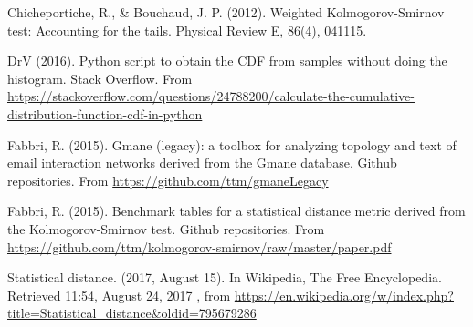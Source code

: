 \documentclass[12pt,fleqn]{article}
\begin{document}
\begin{thebibliography}{99}
\fontsize{11}{0}\selectfont
{}
Chicheportiche, R., \& Bouchaud, J. P. (2012). Weighted Kolmogorov-Smirnov test: Accounting for the tails. Physical Review E, 86(4), 041115.

	DrV (2016). Python script to obtain the CDF from samples without doing the histogram.
		Stack Overflow.
		From \url{https://stackoverflow.com/questions/24788200/calculate-the-cumulative-distribution-function-cdf-in-python}

	Fabbri, R. (2015). Gmane (legacy): a toolbox for analyzing topology and text of email interaction networks derived from the Gmane database. Github repositories. From \url{https://github.com/ttm/gmaneLegacy}

	Fabbri, R. (2015). Benchmark tables for a statistical distance metric derived from the Kolmogorov-Smirnov test. Github repositories. From \url{https://github.com/ttm/kolmogorov-smirnov/raw/master/paper.pdf}

Statistical distance. (2017, August 15). In Wikipedia, The Free Encyclopedia. Retrieved
11:54, August 24, 2017
		, from \url{https://en.wikipedia.org/w/index.php?title=Statistical_distance&oldid=795679286}
\end{thebibliography}





\end{document}
